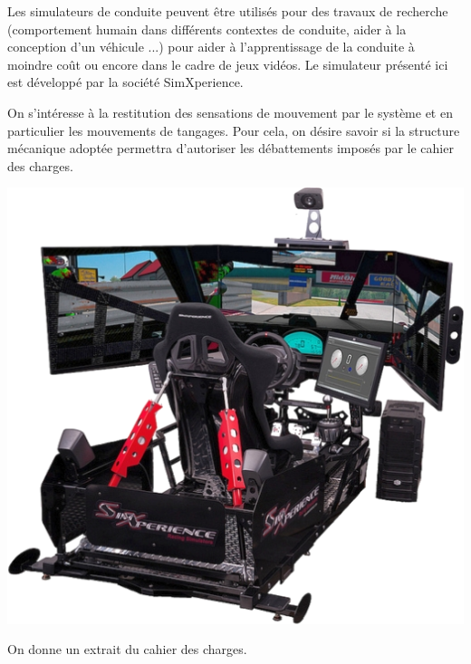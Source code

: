 \documentclass[10pt]{article}
\newif\ifprof
\begin{document}
\begin{minipage}[c]{.7\linewidth}
Les simulateurs de conduite peuvent être utilisés pour des travaux de recherche (comportement humain dans différents contextes de conduite, aider à la conception d'un véhicule ...) pour aider à l'apprentissage de la conduite à moindre coût ou encore dans le cadre de jeux vidéos. Le simulateur présenté ici est développé par la société SimXperience. 
\begin{obj} 

On s'intéresse à la restitution des sensations de mouvement par le système et en particulier les mouvements de tangages. Pour cela, on désire savoir si la structure mécanique adoptée permettra d'autoriser les débattements imposés par le cahier des charges. 
\end{obj}


 
\end{minipage} \hfill
\begin{minipage}[c]{.25\linewidth}
\begin{center}
\includegraphics[width=\textwidth]{images/Simulateur1}
\end{center}
\end{minipage}

\ifprof
\else
 On donne un extrait du cahier des charges.
\end{document}
